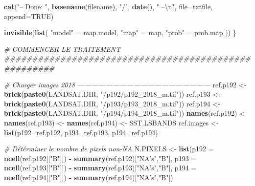 \documentclass[a4paper, notitlepage, 12pt, krantz2]{krantz}
\newenvironment{Shaded}{\begin{snugshade}}{\end{snugshade}}
\newcommand{\CharTok}[1]{\textcolor[rgb]{0.31,0.60,0.02}{#1}}
\newcommand{\CommentTok}[1]{\textcolor[rgb]{0.56,0.35,0.01}{\textit{#1}}}
\newcommand{\DataTypeTok}[1]{\textcolor[rgb]{0.13,0.29,0.53}{#1}}
\newcommand{\KeywordTok}[1]{\textcolor[rgb]{0.13,0.29,0.53}{\textbf{#1}}}
\newcommand{\NormalTok}[1]{#1}
\newcommand{\OperatorTok}[1]{\textcolor[rgb]{0.81,0.36,0.00}{\textbf{#1}}}
\newcommand{\OtherTok}[1]{\textcolor[rgb]{0.56,0.35,0.01}{#1}}
\newcommand{\StringTok}[1]{\textcolor[rgb]{0.31,0.60,0.02}{#1}}
\begin{document}
\begin{Shaded}
\begin{Highlighting}[]
{{  \KeywordTok{cat}\NormalTok{(}\StringTok{"-- Done: "}\NormalTok{, }\KeywordTok{basename}\NormalTok{(filename), }\StringTok{"/"}\NormalTok{, }\KeywordTok{date}\NormalTok{(), }\StringTok{" --}\CharTok{\textbackslash{}n}\StringTok{"}\NormalTok{, }\DataTypeTok{file=}\NormalTok{txtfile, }\DataTypeTok{append=}\OtherTok{TRUE}\NormalTok{)}
  
  \KeywordTok{invisible}\NormalTok{(}\KeywordTok{list}\NormalTok{(}
    \StringTok{"model"}\NormalTok{  =}\StringTok{ }\NormalTok{map.model,}
    \StringTok{"map"}\NormalTok{    =}\StringTok{ }\NormalTok{map,}
    \StringTok{"prob"}\NormalTok{   =}\StringTok{ }\NormalTok{prob.map}
\NormalTok{  ))}
\NormalTok{\}}


\CommentTok{# COMMENCER LE TRAITEMENT #####################################################}

\CommentTok{# Charger images 2018 ---------------------------------------------------------}
\NormalTok{ref.p192 <-}\StringTok{ }\KeywordTok{brick}\NormalTok{(}\KeywordTok{paste0}\NormalTok{(LANDSAT.DIR, }\StringTok{"/p192/p192_2018_m.tif"}\NormalTok{))}
\NormalTok{ref.p193 <-}\StringTok{ }\KeywordTok{brick}\NormalTok{(}\KeywordTok{paste0}\NormalTok{(LANDSAT.DIR, }\StringTok{"/p193/p193_2018_m.tif"}\NormalTok{))}
\NormalTok{ref.p194 <-}\StringTok{ }\KeywordTok{brick}\NormalTok{(}\KeywordTok{paste0}\NormalTok{(LANDSAT.DIR, }\StringTok{"/p194/p194_2018_m.tif"}\NormalTok{))}
\KeywordTok{names}\NormalTok{(ref.p192) <-}\StringTok{ }\KeywordTok{names}\NormalTok{(ref.p193) <-}\StringTok{ }\KeywordTok{names}\NormalTok{(ref.p194) <-}\StringTok{ }\NormalTok{SST.LSBANDS}
\NormalTok{ref.images <-}\StringTok{ }\KeywordTok{list}\NormalTok{(}\DataTypeTok{p192=}\NormalTok{ref.p192, }\DataTypeTok{p193=}\NormalTok{ref.p193, }\DataTypeTok{p194=}\NormalTok{ref.p194)}

\CommentTok{# Détérminer le nombre de pixels non-NA}
\NormalTok{N.PIXELS <-}\StringTok{ }\KeywordTok{list}\NormalTok{(}\DataTypeTok{p192 =} \KeywordTok{ncell}\NormalTok{(ref.p192[[}\StringTok{"B"}\NormalTok{]]) }\OperatorTok{-}\StringTok{ }\KeywordTok{summary}\NormalTok{(ref.p192)[}\StringTok{"NA's"}\NormalTok{,}\StringTok{"B"}\NormalTok{],}
                 \DataTypeTok{p193 =} \KeywordTok{ncell}\NormalTok{(ref.p193[[}\StringTok{"B"}\NormalTok{]]) }\OperatorTok{-}\StringTok{ }\KeywordTok{summary}\NormalTok{(ref.p193)[}\StringTok{"NA's"}\NormalTok{,}\StringTok{"B"}\NormalTok{],}
                 \DataTypeTok{p194 =} \KeywordTok{ncell}\NormalTok{(ref.p194[[}\StringTok{"B"}\NormalTok{]]) }\OperatorTok{-}\StringTok{ }\KeywordTok{summary}\NormalTok{(ref.p194)[}\StringTok{"NA's"}\NormalTok{,}\StringTok{"B"}\NormalTok{])}

}}
\end{Highlighting}
\end{Shaded}
\end{document}
